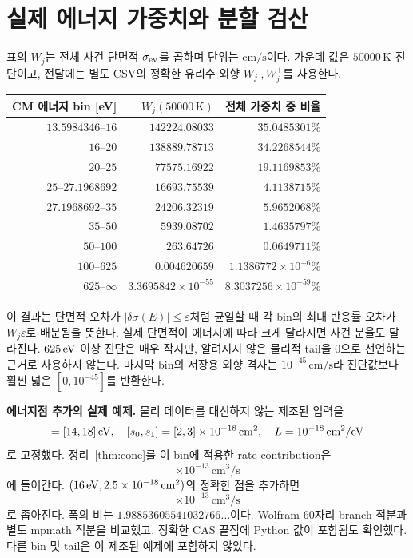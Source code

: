 \documentclass[11pt,a4paper]{article}
\newcommand{\sig}{\sigma_{\rm ev}}\newcommand{\cm}{\mathrm{CM}}\newcommand{\lab}{\mathrm{lab}}\newcommand{\hh}{\mathrm{HH}}
\begin{document}
\newpage
\section{실제 에너지 가중치와 분할 검산}
표의 $W_j$는 전체 사건 단면적 $\sig$를 곱하며 단위는 $\mathrm{cm/s}$이다. 가운데 값은 $50000\,\mathrm K$ 진단이고, 전달에는 별도 CSV의 정확한 유리수 외향 $W_j^-,W_j^+$를 사용한다.

\begin{center}\begin{tabular}{@{}rrr@{}}\toprule
CM 에너지 bin [eV] & $W_j(50000\,\mathrm K)$ & 전체 가중치 중 비율\\\midrule
$13.5984346$--$16$ & $142224.08033$ & $35.0485301\%$\\
$16$--$20$ & $138889.78713$ & $34.2268544\%$\\
$20$--$25$ & $77575.16922$ & $19.1169853\%$\\
$25$--$27.1968692$ & $16693.75539$ & $4.1138715\%$\\
$27.1968692$--$35$ & $24206.32319$ & $5.9652068\%$\\
$35$--$50$ & $5939.08702$ & $1.4635797\%$\\
$50$--$100$ & $263.64726$ & $0.0649711\%$\\
$100$--$625$ & $0.004620659$ & $1.1386772\times10^{-6}\%$\\
$625$--$\infty$ & $3.3695842\times10^{-55}$ & $8.3037256\times10^{-59}\%$\\\bottomrule
\end{tabular}\end{center}

이 결과는 단면적 오차가 $|\delta\sigma(E)|\le\varepsilon$처럼 균일할 때 각 bin의 최대 반응률 오차가 $W_j\varepsilon$로 배분됨을 뜻한다. 실제 단면적이 에너지에 따라 크게 달라지면 사건 분율도 달라진다. $625\,\mathrm{eV}$ 이상 진단은 매우 작지만, 알려지지 않은 물리적 tail을 0으로 선언하는 근거로 사용하지 않는다. 마지막 bin의 저장용 외향 격자는 $10^{-45}\,\mathrm{cm/s}$라 진단값보다 훨씬 넓은 $[0,10^{-45}]$를 반환한다.

\textbf{에너지점 추가의 실제 예제.} 물리 데이터를 대신하지 않는 제조된 입력을
\begin{equation}
[E_0,E_1]=[14,18]\,\eV,\quad
[s_0,s_1]=[2,3]\times10^{-18}\,\mathrm{cm^2},\quad
L=10^{-18}\,\mathrm{cm^2/eV}
\end{equation}
로 고정했다. 정리~\ref{thm:cone}를 이 bin에 적용한 rate contribution은
\begin{equation}
[2.91508867233035,\ 6.56137501417359]\times10^{-13}\,\mathrm{cm^3/s}
\end{equation}
에 들어간다. $(16\,\mathrm{eV},2.5\times10^{-18}\,\mathrm{cm^2})$의 정확한 점을 추가하면
\begin{equation}
[3.85977013311510,\ 5.69342375580028]\times10^{-13}\,\mathrm{cm^3/s}
\end{equation}
로 좁아진다. 폭의 비는 $1.98853605541032766\ldots$이다. Wolfram 60자리 branch 적분과 별도 mpmath 적분을 비교했고, 정확한 CAS 끝점에 Python 값이 포함됨도 확인했다. 다른 bin 및 tail은 이 제조된 예제에 포함하지 않았다.
\end{document}
